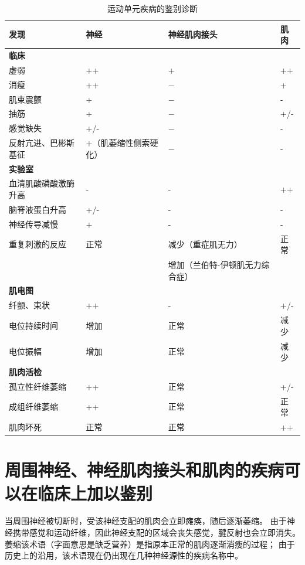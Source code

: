 \begin{table}[htbp]
	\caption{运动单元疾病的鉴别诊断} \label{tab:57_1} \centering
	\begin{tabular}{llll}
		\toprule
		发现 & 神经 & 神经肌肉接头 & 肌肉\\
		\midrule
		\textbf{临床} &  &  &  \\
		虚弱 & ++ & + & ++ \\
		消瘦 & ++ & − & + \\
		肌束震颤 & + & − & - \\
		抽筋 & + & − & +/- \\
		感觉缺失 & +/- & − & - \\
		反射亢进、巴彬斯基征 & +（肌萎缩性侧索硬化） & − & - \\
		\textbf{实验室} &  &  &  \\
		血清肌酸磷酸激酶升高 & - & - & ++ \\
		脑脊液蛋白升高 & +/- & - & - \\
		神经传导减慢 & + & - & - \\
		重复刺激的反应 & 正常 & 减少（重症肌无力） & 正常 \\
		 &  & 增加（兰伯特-伊顿肌无力综合症） &  \\
		\textbf{肌电图} &  &  &  \\
		纤颤、束状 & ++ & - & +/- \\
		电位持续时间 & 增加 & 正常 & 减少 \\
		电位振幅 & 增加 & 正常 & 减少 \\
		\textbf{肌肉活检} &  &  &  \\
		孤立性纤维萎缩 & ++ & 正常 & +/- \\
		成组纤维萎缩 & ++ & 正常 & 正常 \\
		肌肉坏死 & 正常 & 正常 & ++ \\
		\bottomrule
	\end{tabular}
\end{table}



\section{周围神经、神经肌肉接头和肌肉的疾病可以在临床上加以鉴别}

当周围神经被切断时，受该神经支配的肌肉会立即瘫痪，随后逐渐萎缩。
由于神经携带感觉和运动纤维，因此神经支配的区域会丧失感觉，腱反射也会立即消失。
萎缩该术语（字面意思是缺乏营养）是指原本正常的肌肉逐渐消瘦的过程；
由于历史上的沿用，该术语现在仍出现在几种神经源性的疾病名称中。


